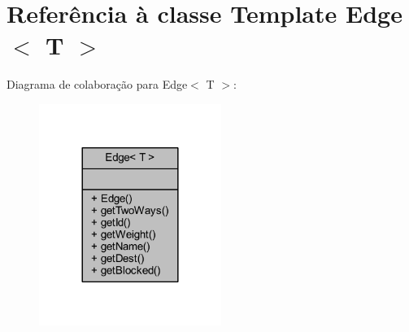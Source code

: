 \hypertarget{class_edge}{}\section{Referência à classe Template Edge$<$ T $>$}
\label{class_edge}


Diagrama de colaboração para Edge$<$ T $>$\+:
\nopagebreak
\begin{figure}[H]
\begin{center}
\leavevmode
\includegraphics[width=168pt]{class_edge__coll__graph}
\end{center}
\end{figure}
